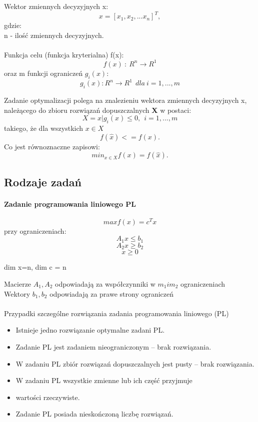 \documentclass[a4paper,twoside]{report}
\begin{document}
Wektor zmiennych decyzyjnych x:
\[x=[x_1, x_2,...x_n]^T,\]
gdzie:\\
n - ilość zmiennych decyzyjnych.
\\\\
Funkcja celu (funkcja kryterialna) f(x):  
\[f(x)~:~R^n \longrightarrow R^1\]
oraz m funkcji ograniczeń $g_i(x)$:
\[g_i(x): R^n \longrightarrow R^1~~dla~i=1,...,m\]

Zadanie optymalizacji polega na znalezieniu wektora zmiennych decyzyjnych 
x, należącego do zbioru rozwiązań dopuszczalnych \textbf{X} w postaci:
\[X = {x|g_i(x) \le 0,~~i=1,...,m}\]
takiego, że dla wszystkich $x \in X$
\[f(\hat{x})<= f(x).\]
Co jest równoznaczne zapisowi:
\[min_{x \in X} f(x) = f(\hat{x}).\]

\subsection{Rodzaje zadań}


\paragraph{Zadanie programowania liniowego PL} 

\[ max f(x) = c^T x \]
przy ograniczeniach: 
\[A_1 x \le b_1\]
\[A_2 x \ge b_2\]
\[x \ge 0\]
  
\begin{center}
dim x=n, dim c = n
\end{center}
Macierze $A_1, A_2$ odpowiadają za współczynniki w $m_1 i m_2$ ograniczeniach
\\
Wektory $b_1, b_2$ odpowiadają za prawe strony ograniczeń
\\ \\
Przypadki szczególne rozwiązania zadania programowania liniowego
(PL)

\begin{itemize}
\item Istnieje jedno rozwiązanie optymalne zadani PL.
\item Zadanie PL jest zadaniem nieograniczonym – brak rozwiązania.
\item W zadaniu PL zbiór rozwiązań dopuszczalnych jest pusty – brak
rozwiązania.
\item W zadaniu PL wszystkie zmienne lub ich część przyjmuje
\item wartości rzeczywiste.
\item Zadanie PL posiada nieskończoną liczbę rozwiązań.
\end{itemize}
 
\end{document}
